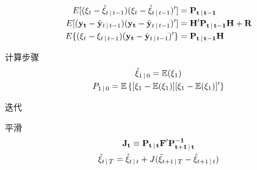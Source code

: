 \documentclass[11pt]{article}
\begin{document}
\begin{align*}
    E[(\xi_{t} - \hat{\xi}_{t\,\vert\, t-1})(\xi_{t} - \hat{\xi}_{t\,\vert\, t-1})'] &= \mathbf{P_{t\,\vert\, t-1}} \\ E[(\mathbf{y_t} - \hat{\mathbf{y}}_{t\,\vert\, t-1})(\mathbf{y_t} - \hat{\mathbf{y}}_{t\,\vert\, t-1})'] &= \mathbf{H'P_{t\,\vert\, t-1}H+R} \\
    E\{(\xi_t - \xi_{t\,\vert\, t-1})(\mathbf{y_t} - \hat{\mathbf{y}}_{t\,\vert\, t-1})'\} &= \mathbf{P_{t\,\vert\, t-1}H} \\
\end{align*}

计算步骤
\begin{gather*}
    \hat{\xi}_{1\,\vert\, 0} = \mathbb{E}(\xi_1) \\
    P_{1\,\vert\, 0} = \mathbb{E} \left\{[\xi_1 - \mathbb{E}(\xi_1)][\xi_1 - \mathbb{E}(\xi_1)]'\right\}
\end{gather*}

迭代

平滑
\begin{gather*}
    \mathbf{J_t} \equiv \mathbf{P_{t\,\vert\, t}F'P^{-1}_{t+1\,\vert\, t}} \\
    \hat{\mathbf{\xi}}_{t \,\vert\, T} = \hat{\mathbf{\xi}}_{t \,\vert\, t} + J(\hat{\xi}_{t+1 \,\vert\, T} - \hat{\xi}_{t+1 \,\vert\, t})
\end{gather*}

\appendix
\end{document}
